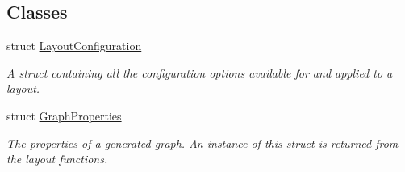 \subsection*{Classes}
\begin{DoxyCompactItemize}
\item 
struct \hyperlink{structLayoutConfiguration}{Layout\+Configuration}
\begin{DoxyCompactList}\small\item\em A struct containing all the configuration options available for and applied to a layout. \end{DoxyCompactList}\item 
struct \hyperlink{structGraphProperties}{Graph\+Properties}
\begin{DoxyCompactList}\small\item\em The properties of a generated graph. An instance of this struct is returned from the layout functions. \end{DoxyCompactList}\end{DoxyCompactItemize}
